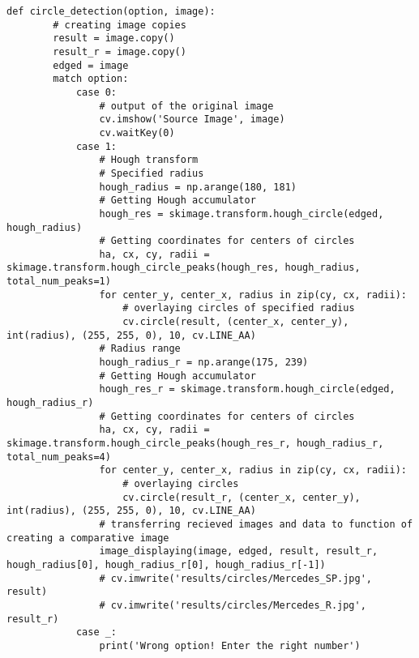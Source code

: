\begin{lstlisting}[caption={Исходный код функции для нахождения и отображения окружностей с помощью преобразования Хафа}, label={lst:line_compute}]
    def circle_detection(option, image):
        # creating image copies
        result = image.copy()
        result_r = image.copy()
        edged = image
        match option:
            case 0:
                # output of the original image
                cv.imshow('Source Image', image)
                cv.waitKey(0)
            case 1:
                # Hough transform
                # Specified radius
                hough_radius = np.arange(180, 181)
                # Getting Hough accumulator
                hough_res = skimage.transform.hough_circle(edged, hough_radius)
                # Getting coordinates for centers of circles 
                ha, cx, cy, radii = skimage.transform.hough_circle_peaks(hough_res, hough_radius, total_num_peaks=1)
                for center_y, center_x, radius in zip(cy, cx, radii):
                    # overlaying circles of specified radius
                    cv.circle(result, (center_x, center_y), int(radius), (255, 255, 0), 10, cv.LINE_AA)
                # Radius range
                hough_radius_r = np.arange(175, 239)
                # Getting Hough accumulator
                hough_res_r = skimage.transform.hough_circle(edged, hough_radius_r)
                # Getting coordinates for centers of circles 
                ha, cx, cy, radii = skimage.transform.hough_circle_peaks(hough_res_r, hough_radius_r, total_num_peaks=4)
                for center_y, center_x, radius in zip(cy, cx, radii):
                    # overlaying circles
                    cv.circle(result_r, (center_x, center_y), int(radius), (255, 255, 0), 10, cv.LINE_AA)
                # transferring recieved images and data to function of creating a comparative image
                image_displaying(image, edged, result, result_r, hough_radius[0], hough_radius_r[0], hough_radius_r[-1])
                # cv.imwrite('results/circles/Mercedes_SP.jpg', result)
                # cv.imwrite('results/circles/Mercedes_R.jpg', result_r)
            case _:
                print('Wrong option! Enter the right number')
    \end{lstlisting}


